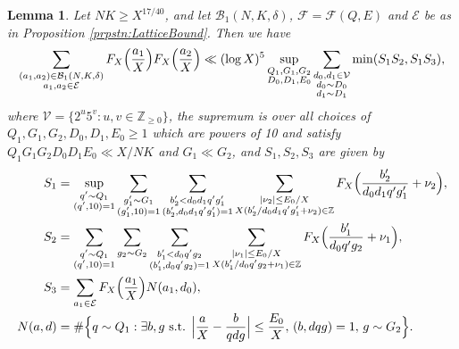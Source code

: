 \documentclass[10pt]{amsart}
\theoremstyle{plain}
\newtheorem{lmm}[thrm]{Lemma}
\numberwithin{sblmm}{thrm}
\numberwithin{equation}{section}
\begin{document}
\begin{lmm}\label{lmm:LatticeSums}
Let $N K\ge X^{17/40}$, and let $\mathcal{B}_1(N,K,\delta)$, $\mathcal{F}=\mathcal{F}(Q,E)$ and $\mathcal{E}$ be as in Proposition \ref{prpstn:LatticeBound}. Then we have
\[
\sum_{\substack{(a_1,a_2)\in\mathcal{B}_1(N,K,\delta)\\ a_1,a_2\in\mathcal{E}}}F_X\Bigl(\frac{a_1}{X}\Bigr)F_X\Bigl(\frac{a_2}{X}\Bigr)
\ll (\log{X})^5\sup_{\substack{Q_1,G_1,G_2\\ D_0,D_1,E_0}}\sum_{\substack{d_0,d_1\in\mathcal{V}\\ d_0\sim D_0\\ d_1\sim D_1}} \min(S_1S_2,S_1S_3),
\]
where $\mathcal{V}=\{2^u 5^v:u,v\in\mathbb{Z}_{\ge0}\}$, the supremum is over all choices of $Q_1,G_1,G_2,D_0,D_1,E_0\ge 1$ which are powers of 10 and satisfy $Q_1 G_1 G_2 D_0 D_1 E_0\ll X/N K$ and $G_1\ll G_2$, and $S_1,S_2,S_3$ are given by
\begin{align*}
S_1&=\sup_{\substack{q'\sim Q_1\\ (q',10)=1}}\sum_{\substack{g_1'\sim G_1\\ (g_1',10)=1}} \sum_{\substack{b_2'<d_0d_1 q' g_1' \\ (b_2',d_0 d_1 q' g_1')=1}}\sum_{\substack{|\nu_2|\le E_0/X\\ X(b_2'/d_0 d_1 q' g_1'+\nu_2)\in\mathbb{Z}}}F_{X}\Bigl(\frac{b_2'}{d_0 d_1 q' g_1'}+\nu_2\Bigr),\\
S_2&=\sum_{\substack{q'\sim Q_1\\ (q',10)=1}} \sum_{g_2\sim G_2}\sum_{\substack{b_1'<d_0 q' g_2 \\ (b_1',d_0 q' g_2)=1}} \sum_{\substack{|\nu_1|\le E_0/X \\ X(b_1'/d_0 q' g_2+\nu_1)\in\mathbb{Z}}}F_{X}\Bigl(\frac{b_1'}{d_0 q' g_2}+\nu_1\Bigr),\\
S_3&=\sum_{a_1\in\mathcal{E}}F_X\Bigl(\frac{a_1}{X}\Bigr)N(a_1,d_0),\\
N(a,d)&=\#\Bigl\{q\sim Q_1:\exists b,g\text{ s.t. }\Bigl|\frac{a}{X}-\frac{b}{q d g}\Bigr|\le \frac{E_0}{X},\,(b,d q g)=1,\,g \sim G_2\Bigr\}.
\end{align*}
\end{lmm}
%
%
%
%
\end{document}

